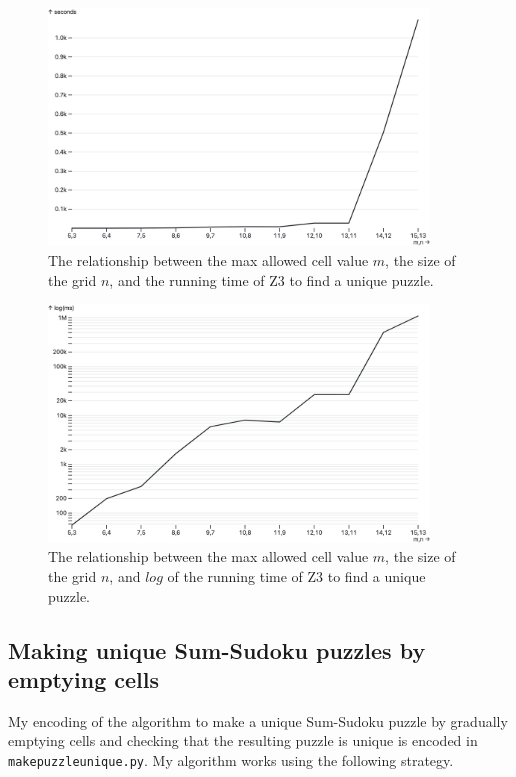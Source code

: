 \documentclass{article}
\newcommand{\code}[1]{\texttt{#1}}
\begin{document}
\begin{figure}
  \centering
  \includegraphics[width=0.9\textwidth]{sumsudoku}
  \caption{The relationship between the max allowed cell value $m$, the size of the grid $n$, and the running time of Z3 to find a unique puzzle.}
  \label{fig:sumsudoku}
\end{figure}

\begin{figure}
  \centering
  \includegraphics[width=0.9\textwidth]{sumsudoku-log}
  \caption{The relationship between the max allowed cell value $m$, the size of the grid $n$, and $log$ of the running time of Z3 to find a unique puzzle.}
  \label{fig:sumsudoku-log}
\end{figure}

\subsection{Making unique Sum-Sudoku puzzles by emptying cells}

My encoding of the algorithm to make a unique Sum-Sudoku puzzle by gradually emptying cells and checking that the resulting puzzle is unique is encoded in \code{makepuzzleunique.py}. My algorithm works using the following strategy.
\end{document}
